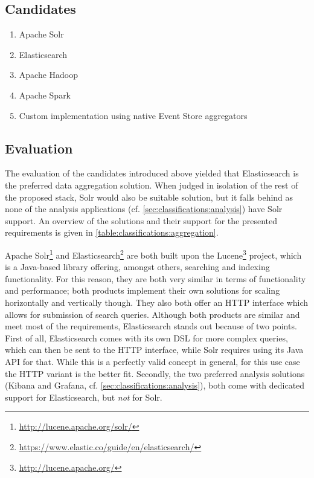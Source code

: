\subsection{Candidates}

\begin{enumerate}
\item Apache Solr
\item Elasticsearch
\item Apache Hadoop
\item Apache Spark
\item Custom implementation using native Event Store aggregators
\end{enumerate}

\subsection{Evaluation}


The evaluation of the candidates introduced above yielded that Elasticsearch is the preferred data aggregation solution.
When judged in isolation of the rest of the proposed stack, Solr would also be suitable solution, but it falls behind as none of the analysis applications (cf. \cref{sec:classifications:analysis}) have Solr support.
An overview of the solutions and their support for the presented requirements is given in \cref{table:classifications:aggregation}.

Apache Solr\footnote{\url{http://lucene.apache.org/solr/}} and Elasticsearch\footnote{\url{https://www.elastic.co/guide/en/elasticsearch/}} are both built upon the Lucene\footnote{\url{http://lucene.apache.org/}} project, which is a Java-based library offering, amongst others, searching and indexing functionality.
For this reason, they are both very similar in terms of functionality and performance; both products implement their own solutions for scaling horizontally and vertically though.
They also both offer an HTTP interface which allows for submission of search queries.
Although both products are similar and meet most of the requirements, Elasticsearch stands out because of two points. 
First of all, Elasticsearch comes with its own \ac{DSL} for more complex queries, which can then be sent to the HTTP interface, while Solr requires using its Java API for that.
While this is a perfectly valid concept in general, for this use case the HTTP variant is the better fit.
Secondly, the two preferred analysis solutions (Kibana and Grafana, cf. \cref{sec:classifications:analysis}), both come with dedicated support for Elasticsearch, but \emph{not} for Solr.

